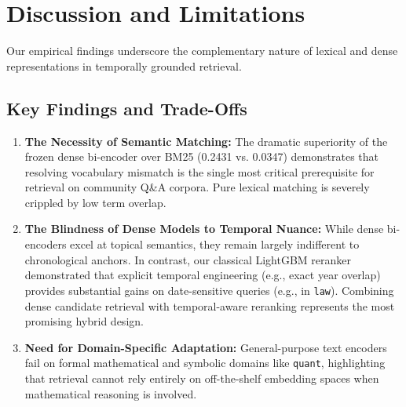 \section{Discussion and Limitations}
\label{sec:discussion}

Our empirical findings underscore the complementary nature of lexical and dense representations in temporally grounded retrieval.

\subsection{Key Findings and Trade-Offs}
\begin{enumerate}
    \item \textbf{The Necessity of Semantic Matching:} The dramatic superiority of the frozen dense bi-encoder over BM25 (0.2431 vs. 0.0347) demonstrates that resolving vocabulary mismatch is the single most critical prerequisite for retrieval on community Q\&A corpora. Pure lexical matching is severely crippled by low term overlap.
    \item \textbf{The Blindness of Dense Models to Temporal Nuance:} While dense bi-encoders excel at topical semantics, they remain largely indifferent to chronological anchors. In contrast, our classical LightGBM reranker demonstrated that explicit temporal engineering (e.g., exact year overlap) provides substantial gains on date-sensitive queries (e.g., in \texttt{law}). Combining dense candidate retrieval with temporal-aware reranking represents the most promising hybrid design.
    \item \textbf{Need for Domain-Specific Adaptation:} General-purpose text encoders fail on formal mathematical and symbolic domains like \texttt{quant}, highlighting that retrieval cannot rely entirely on off-the-shelf embedding spaces when mathematical reasoning is involved.
\end{enumerate}

